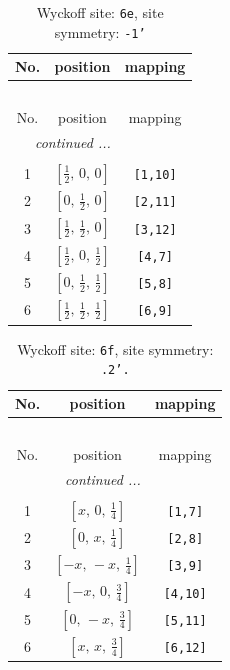\documentclass[fleqn,8pt]{jsarticle}
\begin{document}
\renewcommand{\arraystretch}{1.2}
\begin{longtable}{ccc}
\caption{Wyckoff site: {\tt 6e}, site symmetry: {\tt -1'}}
 \\
 \hline \hline
No. & position & mapping \\ \hline \endfirsthead

\multicolumn{2}{l}{\tablename\ \thetable{}} \\
 \hline \hline
No. & position & mapping \\ \hline \endhead

 \hline \hline
\multicolumn{2}{r}{\footnotesize\it continued ...} \\ \endfoot

 \hline \hline
\multicolumn{2}{r}{} \\ \endlastfoot

1 & $\left[ \frac{1}{2},\, 0,\, 0 \right]$ & {\tt [1,10]} \\ \hline
2 & $\left[ 0,\, \frac{1}{2},\, 0 \right]$ & {\tt [2,11]} \\ \hline
3 & $\left[ \frac{1}{2},\, \frac{1}{2},\, 0 \right]$ & {\tt [3,12]} \\ \hline
4 & $\left[ \frac{1}{2},\, 0,\, \frac{1}{2} \right]$ & {\tt [4,7]} \\ \hline
5 & $\left[ 0,\, \frac{1}{2},\, \frac{1}{2} \right]$ & {\tt [5,8]} \\ \hline
6 & $\left[ \frac{1}{2},\, \frac{1}{2},\, \frac{1}{2} \right]$ & {\tt [6,9]} \\
\end{longtable}
\renewcommand{\arraystretch}{1.2}
\begin{longtable}{ccc}
\caption{Wyckoff site: {\tt 6f}, site symmetry: {\tt .2'.}}
 \\
 \hline \hline
No. & position & mapping \\ \hline \endfirsthead

\multicolumn{2}{l}{\tablename\ \thetable{}} \\
 \hline \hline
No. & position & mapping \\ \hline \endhead

 \hline \hline
\multicolumn{2}{r}{\footnotesize\it continued ...} \\ \endfoot

 \hline \hline
\multicolumn{2}{r}{} \\ \endlastfoot

1 & $\left[ x,\, 0,\, \frac{1}{4} \right]$ & {\tt [1,7]} \\ \hline
2 & $\left[ 0,\, x,\, \frac{1}{4} \right]$ & {\tt [2,8]} \\ \hline
3 & $\left[ - x,\, - x,\, \frac{1}{4} \right]$ & {\tt [3,9]} \\ \hline
4 & $\left[ - x,\, 0,\, \frac{3}{4} \right]$ & {\tt [4,10]} \\ \hline
5 & $\left[ 0,\, - x,\, \frac{3}{4} \right]$ & {\tt [5,11]} \\ \hline
6 & $\left[ x,\, x,\, \frac{3}{4} \right]$ & {\tt [6,12]} \\
\end{longtable}
\end{document}
